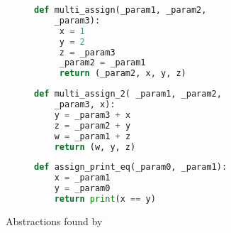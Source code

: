 \begin{figure}
    \begin{subfigure}[t]{0.45\textwidth}
        \begin{lstlisting}[language=Python, firstnumber=1]
def multi_assign(_param1, _param2,
    _param3):
     x = 1
     y = 2
     z = _param3
     _param2 = _param1
     return (_param2, x, y, z)
        \end{lstlisting}
        \label{fig:func5}
    \end{subfigure}\hfill
    \begin{subfigure}[t]{0.45\textwidth}
        \begin{lstlisting}[language=Python, firstnumber=1]
def multi_assign_2( _param1, _param2,
    _param3, x):
    y = _param3 + x
    z = _param2 + y
    w = _param1 + z
    return (w, y, z)
        \end{lstlisting}
        \label{fig:func6}
    \end{subfigure}
    
    \vspace{0.5cm} %
    
    \begin{subfigure}[t]{0.45\textwidth}
        \begin{lstlisting}[language=Python, firstnumber=1]
def assign_print_eq(_param0, _param1):
    x = _param1
    y = _param0
    return print(x == y)
        \end{lstlisting}
        \label{fig:func7}
    \end{subfigure}
    
    \caption{Abstractions found by \toolname}
    \label{fig:leroy-abstractions}
\end{figure}
